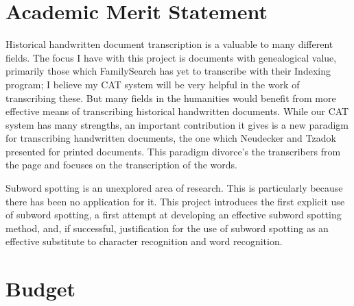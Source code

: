\documentclass[conference]{IEEEtran}
\begin{document}
\section{Academic Merit Statement}
Historical handwritten document transcription is a valuable to many different fields. The focus I have with this project is documents with genealogical value, primarily those which FamilySearch has yet to transcribe with their Indexing program; I believe my CAT system will be very helpful in the work of transcribing these. But many fields in the humanities would benefit from more effective means of transcribing historical handwritten documents. While our CAT system has many strengths, an important contribution it gives is a new paradigm for transcribing handwritten documents, the one which Neudecker and Tzadok\cite{Neudecker2010} presented for printed documents. This paradigm divorce's the transcribers from the page and focuses on the transcription of the words.

Subword spotting is an unexplored area of research. This is particularly because there has been no application for it. This project introduces the first explicit use of subword spotting, a first attempt at developing an effective subword spotting method, and, if successful, justification for the use of subword spotting as an effective substitute to character recognition and word recognition.

\newpage
\section{Budget}



%
%


\end{document}
